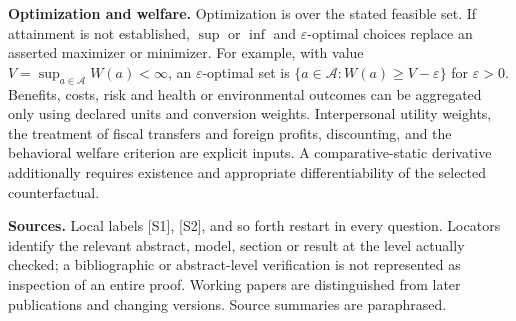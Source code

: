 \documentclass[11pt,a4paper]{article}
\begin{document}
\textbf{Optimization and welfare.} Optimization is over the stated feasible set. If attainment is not established, $\sup$ or $\inf$ and $\varepsilon$-optimal choices replace an asserted maximizer or minimizer. For example, with value $V=\sup_{a\in\mathcal A}W(a)<\infty$, an $\varepsilon$-optimal set is $\{a\in\mathcal A:W(a)\geq V-\varepsilon\}$ for $\varepsilon>0$. Benefits, costs, risk and health or environmental outcomes can be aggregated only using declared units and conversion weights. Interpersonal utility weights, the treatment of fiscal transfers and foreign profits, discounting, and the behavioral welfare criterion are explicit inputs. A comparative-static derivative additionally requires existence and appropriate differentiability of the selected counterfactual.

\textbf{Sources.} Local labels [S1], [S2], and so forth restart in every question. Locators identify the relevant abstract, model, section or result at the level actually checked; a bibliographic or abstract-level verification is not represented as inspection of an entire proof. Working papers are distinguished from later publications and changing versions. Source summaries are paraphrased.
\end{document}
